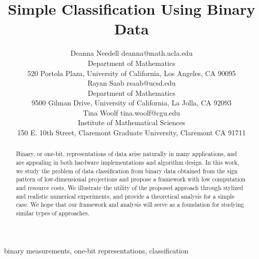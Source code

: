 \documentclass[twoside,11pt]{article}
\newcommand{\edit}[1]{{{#1}}}
\begin{document}
\title{Simple Classification Using Binary Data}

\author{\name Deanna Needell \email deanna@math.ucla.edu\\
   \addr Department of Mathematics\\
             520 Portola Plaza, University of California, Los Angeles, CA 90095\\
\AND
\name Rayan Saab \email rsaab@ucsd.edu\\
   \addr Department of Mathematics\\
             9500 Gilman Drive, University of California, La Jolla, CA 92093\\
\AND
\name Tina Woolf \email tina.woolf@cgu.edu\\
\addr Institute of Mathematical Sciences \\
 150 E. 10th Street, Claremont Graduate University, Claremont CA 91711}


\maketitle

\begin{abstract}%
Binary, or one-bit, representations of data arise naturally in many applications, and are appealing in both hardware implementations and algorithm design. In this work, we study the problem of data classification from binary data \edit{obtained from the sign pattern of low-dimensional projections} and propose a framework with low computation and resource costs. We illustrate the utility of the proposed approach through stylized and realistic numerical experiments, and provide a theoretical analysis for a simple case. We hope that our framework and analysis will serve as a foundation for studying similar types of approaches. 
\end{abstract}



\begin{keywords}
binary measurements, one-bit representations, classification
\end{keywords}
\end{document}
